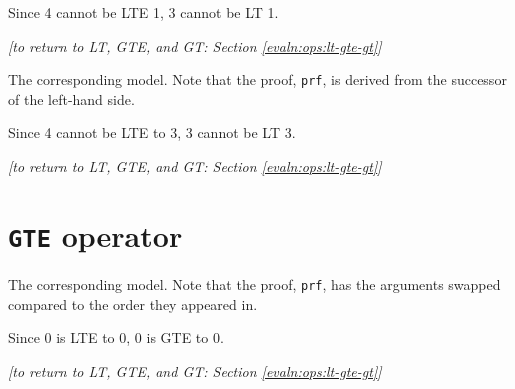     
    Since 4 cannot be LTE 1, 3 cannot be LT 1.
    \\
    
    \begin{flushright}
        \textit{[to return to LT, GTE, and GT: Section \ref{evaln:ops:lt-gte-gt}]}
    \end{flushright}
    
    \newpage
    
    
    
    The corresponding \Idris model. Note that the proof, \texttt{prf}, is derived from the successor of the left-hand side.
    
    
    Since 4 cannot be LTE to 3, 3 cannot be LT 3.
    \\
    
    \begin{flushright}
        \textit{[to return to LT, GTE, and GT: Section \ref{evaln:ops:lt-gte-gt}]}
    \end{flushright}
    
    \newpage

\newpage


\section{\texttt{GTE} operator}\label{app:evaln:ops:gte}
    
    
    The corresponding \Idris model. Note that the proof, \texttt{prf}, has the arguments swapped compared to the order they appeared in.
    
    
    Since 0 is LTE to 0, 0 is GTE to 0.
    \\
    
    \begin{flushright}
        \textit{[to return to LT, GTE, and GT: Section \ref{evaln:ops:lt-gte-gt}]}
    \end{flushright}
    
